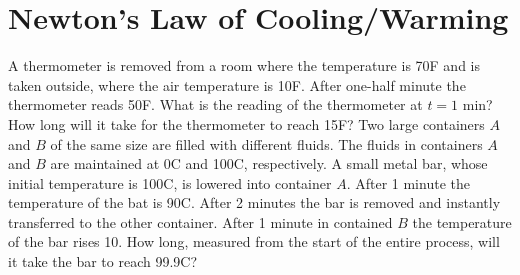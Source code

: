 \documentclass[chapter=3,section=1]{math252homework}
\begin{document}
\section{Newton's Law of Cooling/Warming}\label{sec:newton's-law-of-cooling/warming}
\begin{problems}[start=13]
	\problem A thermometer is removed from a room where the temperature is 70\textdegree F and is taken outside, where the air temperature is 10\textdegree F. After one-half minute the thermometer reads 50\textdegree F. What is the reading of the thermometer at $t=1$ min? How long will it take for the thermometer to reach 15\textdegree F?
	\setcounter{problemsi}{15}
	\problem Two large containers $A$ and $B$ of the same size are filled with different fluids. The fluids in containers $A$ and $B$ are maintained at 0\textdegree C and 100\textdegree C, respectively. A small metal bar, whose initial temperature is 100\textdegree C, is lowered into container $A$. After 1 minute the temperature of the bat is 90\textdegree C. After 2 minutes the bar is removed and instantly transferred to the other container. After 1 minute in contained $B$ the temperature of the bar rises 10\textdegree. How long, measured from the start of the entire process, will it take the bar to reach 99.9\textdegree C?
\end{problems}
\end{document}
